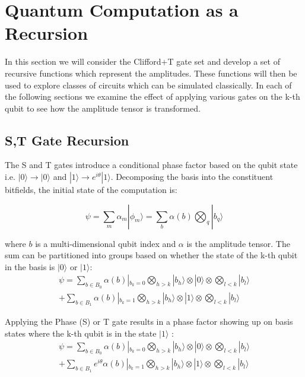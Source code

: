 \documentclass[reqno]{amsart}
\theoremstyle{definition}
\theoremstyle{remark}
\begin{document}
\noindent
\newline

\newpage
\section{Quantum Computation as a Recursion}
\noindent
In this section we will consider the Clifford+T gate set and develop a set of recursive functions which represent the amplitudes. These functions will then be used to explore classes of circuits which can be simulated classically. In each of the following sections we examine the effect of applying various gates on the k-th qubit to see how the amplitude tensor is transformed. 
\newline

\subsection{S,T Gate Recursion}
The S and T gates introduce a conditional phase factor based on the  qubit state i.e. $|0\rangle \rightarrow |0\rangle$ and $ |1\rangle \rightarrow e^{i\theta}|1\rangle$. Decomposing the basis into the constituent bitfields, the initial state of the computation is:

\begin{equation}
\psi=\sum_m\alpha_m|\phi_m\rangle =\sum_b\alpha(b)\bigotimes_{q}{} | b_q\rangle
\end{equation}

\noindent
where $b$ is a multi-dimensional qubit index and $\alpha$ is the amplitude tensor.
The sum can be partitioned into groups based on whether the state of the k-th qubit in the basis is $|0\rangle$ or $|1\rangle$:
\begin{equation}
\begin{split}
\psi=\sum_{b\in B_0}\alpha(b)|_{b_k=0} \bigotimes_{h>k}{}|b_{h}\rangle\otimes|0\rangle\otimes\bigotimes_{l<k}|b_l\rangle \\
+ \sum_{b \in B_1}\alpha(b)|_{b_k=1} \bigotimes_{h>k}{}|b_{h}\rangle\otimes|1\rangle\otimes\bigotimes_{l<k}|b_l\rangle
\end{split}
\end{equation}



\noindent
Applying the Phase (S) or T gate results in a phase factor showing up on basis states where the k-th qubit is in the state $|1\rangle$ :
\begin{equation}
\begin{split}
\psi=\sum_{b \in B_0}\alpha(b)|_{b_k=0} \bigotimes_{h>k}{}|b_{h}\rangle\otimes|0\rangle\otimes\bigotimes_{l<k}|b_l\rangle \\
+ \sum_{b \in B_1}e^{i\theta
}\alpha(b)|_{b_k=1} \bigotimes_{h>k}{}|b_{h}\rangle\otimes|1\rangle\otimes\bigotimes_{l<k}|b_l\rangle
\end{split}
\end{equation}
\end{document}
